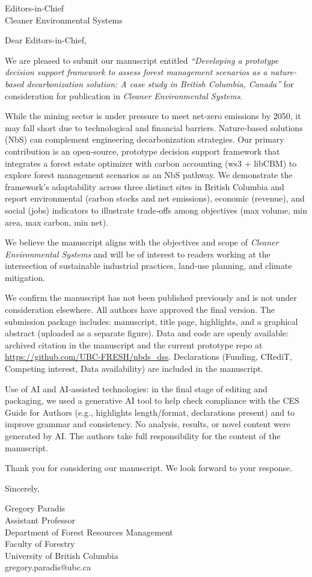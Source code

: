 \documentclass[12pt]{letter}
\date{\today}
\begin{document}
\begin{letter}{Editors-in-Chief\\Cleaner Environmental Systems}

\opening{Dear Editors-in-Chief,}

We are pleased to submit our manuscript entitled \textit{“Developing a prototype decision support framework to assess forest management scenarios as a nature-based decarbonization solution: A case study in British Columbia, Canada”} for consideration for publication in \textit{Cleaner Environmental Systems}.

While the mining sector is under pressure to meet net‑zero emissions by 2050, it may fall short due to technological and financial barriers. Nature‑based solutions (NbS) can complement engineering decarbonization strategies. Our primary contribution is an open‑source, prototype decision support framework that integrates a forest estate optimizer with carbon accounting (ws3 + libCBM) to explore forest management scenarios as an NbS pathway. We demonstrate the framework’s adaptability across three distinct sites in British Columbia and report environmental (carbon stocks and net emissions), economic (revenue), and social (jobs) indicators to illustrate trade‑offs among objectives (max volume, min area, max carbon, min net).

We believe the manuscript aligns with the objectives and scope of \textit{Cleaner Environmental Systems} and will be of interest to readers working at the intersection of sustainable industrial practices, land‑use planning, and climate mitigation.

We confirm the manuscript has not been published previously and is not under consideration elsewhere. All authors have approved the final version. The submission package includes: manuscript, title page, highlights, and a graphical abstract (uploaded as a separate figure). Data and code are openly available: archived citation in the manuscript and the current prototype repo at \url{https://github.com/UBC-FRESH/nbds_dss}. Declarations (Funding, CRediT, Competing interest, Data availability) are included in the manuscript.

Use of AI and AI‑assisted technologies: in the final stage of editing and packaging, we used a generative AI tool to help check compliance with the CES Guide for Authors (e.g., highlights length/format, declarations present) and to improve grammar and consistency. No analysis, results, or novel content were generated by AI. The authors take full responsibility for the content of the manuscript.

Thank you for considering our manuscript. We look forward to your response.

Sincerely,

\vspace{1em}
\noindent
Gregory Paradis\\
Assistant Professor\\
Department of Forest Resources Management\\
Faculty of Forestry\\
University of British Columbia\\
gregory.paradis@ubc.ca

\end{letter}
\end{document}
